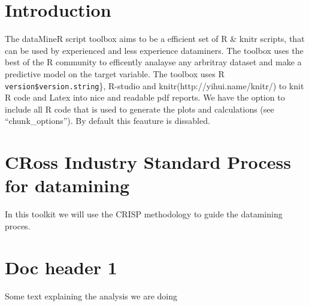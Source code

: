 \documentclass[]{article}
\newenvironment{Shaded}{}{}
\newcommand{\KeywordTok}[1]{\textcolor[rgb]{0.00,0.44,0.13}{\textbf{{#1}}}}
\newcommand{\DataTypeTok}[1]{\textcolor[rgb]{0.56,0.13,0.00}{{#1}}}
\newcommand{\StringTok}[1]{\textcolor[rgb]{0.25,0.44,0.63}{{#1}}}
\newcommand{\CommentTok}[1]{\textcolor[rgb]{0.38,0.63,0.69}{\textit{{#1}}}}
\newcommand{\OtherTok}[1]{\textcolor[rgb]{0.00,0.44,0.13}{{#1}}}
\newcommand{\NormalTok}[1]{{#1}}
\begin{document}
\tableofcontents

\begin{Shaded}
\end{Shaded}
\section{Introduction}

The dataMineR script toolbox aims to be a efficient set of R \& knitr
scripts, that can be used by experienced and less experience dataminers.
The toolbox uses the best of the R community to efficently analayse any
arbritray dataset and make a predictive model on the target variable.
The toolbox uses R \texttt{version\$version.string}\}, R-studio and
knitr(http://yihui.name/knitr/) to knit R code and Latex into nice and
readable pdf reports. We have the option to include all R code that is
used to generate the plots and calculations (see ``chunk\_options''). By
default this feauture is dissabled.

\section{CRoss Industry Standard Process for datamining}

In this toolkit we will use the CRISP methodology to guide the
datamining proces.

\section{Doc header 1}

Some text explaining the analysis we are doing
\end{document}

